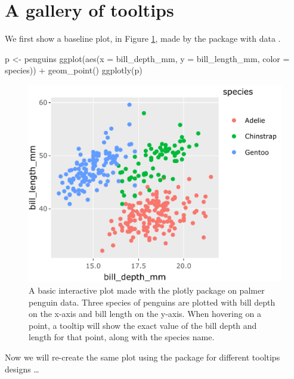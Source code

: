 \hypertarget{a-gallery-of-tooltips}{%
\section{A gallery of tooltips}\label{a-gallery-of-tooltips}}

We first show a baseline plot, in Figure \ref{fig:penguins-plotly}, made
by the  package with  data
\citep{palmerpenguins}.

\begin{Schunk}
\begin{Sinput}
p <- penguins %
  ggplot(aes(x = bill_depth_mm, y = bill_length_mm, 
             color = species)) + 
  geom_point()
ggplotly(p)
\end{Sinput}
\begin{figure}
\includegraphics{sample-article_files/figure-latex/penguins-plotly-1} \caption[A basic interactive plot made with the plotly package on palmer penguin data]{A basic interactive plot made with the plotly package on palmer penguin data. Three species of penguins are plotted with bill depth on the x-axis and bill length on the y-axis. When hovering on a point, a tooltip will show the exact value of the bill depth and length for that point, along with the species name.}\label{fig:penguins-plotly}
\end{figure}
\end{Schunk}

Now we will re-create the same plot using the  package
for different tooltips designs \ldots{}

